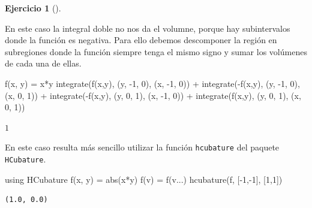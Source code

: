 \documentclass[
  a4paper,
]{scrreport}
\newenvironment{Shaded}{\begin{snugshade}}{\end{snugshade}}
\newcommand{\BuiltInTok}[1]{\textcolor[rgb]{0.00,0.23,0.31}{#1}}
\newcommand{\FloatTok}[1]{\textcolor[rgb]{0.68,0.00,0.00}{#1}}
\newcommand{\FunctionTok}[1]{\textcolor[rgb]{0.28,0.35,0.67}{#1}}
\newcommand{\ImportTok}[1]{\textcolor[rgb]{0.00,0.46,0.62}{#1}}
\newcommand{\NormalTok}[1]{\textcolor[rgb]{0.00,0.23,0.31}{#1}}
\newcommand{\OperatorTok}[1]{\textcolor[rgb]{0.37,0.37,0.37}{#1}}
\theoremstyle{definition}
\newtheorem{exercise}{Ejercicio}[chapter]
\theoremstyle{remark}
\begin{document}
\begin{exercise}[]
\begin{enumerate}
\begin{tcolorbox}
  En este caso la integral doble no nos da el volumne, porque hay
  subintervalos donde la función es negativa. Para ello debemos
  descomponer la región en subregiones donde la función siempre tenga el
  mismo signo y sumar los volúmenes de cada una de ellas.

\begin{Shaded}
\begin{Highlighting}[]
\FunctionTok{f}\NormalTok{(x, y) }\OperatorTok{=}\NormalTok{ x}\OperatorTok{*}\NormalTok{y  }
\FunctionTok{integrate}\NormalTok{(}\FunctionTok{f}\NormalTok{(x,y), (y, }\OperatorTok{{-}}\FloatTok{1}\NormalTok{, }\FloatTok{0}\NormalTok{), (x, }\OperatorTok{{-}}\FloatTok{1}\NormalTok{, }\FloatTok{0}\NormalTok{)) }\OperatorTok{+} \FunctionTok{integrate}\NormalTok{(}\FunctionTok{{-}f}\NormalTok{(x,y), (y, }\OperatorTok{{-}}\FloatTok{1}\NormalTok{, }\FloatTok{0}\NormalTok{), (x, }\FloatTok{0}\NormalTok{, }\FloatTok{1}\NormalTok{)) }\OperatorTok{+} \FunctionTok{integrate}\NormalTok{(}\FunctionTok{{-}f}\NormalTok{(x,y), (y, }\FloatTok{0}\NormalTok{, }\FloatTok{1}\NormalTok{), (x, }\OperatorTok{{-}}\FloatTok{1}\NormalTok{, }\FloatTok{0}\NormalTok{)) }\OperatorTok{+} \FunctionTok{integrate}\NormalTok{(}\FunctionTok{f}\NormalTok{(x,y), (y, }\FloatTok{0}\NormalTok{, }\FloatTok{1}\NormalTok{), (x, }\FloatTok{0}\NormalTok{, }\FloatTok{1}\NormalTok{))}
\end{Highlighting}
\end{Shaded}

  $1$

  En este caso resulta más sencillo utilizar la función
  \texttt{hcubature} del paquete \texttt{HCubature}.

\begin{Shaded}
\begin{Highlighting}[]
\ImportTok{using} \BuiltInTok{HCubature}
\FunctionTok{f}\NormalTok{(x, y) }\OperatorTok{=} \FunctionTok{abs}\NormalTok{(x}\OperatorTok{*}\NormalTok{y)}
\FunctionTok{f}\NormalTok{(v) }\OperatorTok{=} \FunctionTok{f}\NormalTok{(v}\OperatorTok{...}\NormalTok{)}
\FunctionTok{hcubature}\NormalTok{(f, [}\OperatorTok{{-}}\FloatTok{1}\NormalTok{,}\OperatorTok{{-}}\FloatTok{1}\NormalTok{], [}\FloatTok{1}\NormalTok{,}\FloatTok{1}\NormalTok{])}
\end{Highlighting}
\end{Shaded}

\begin{verbatim}
(1.0, 0.0)
\end{verbatim}

  \end{tcolorbox}
\end{enumerate}

\end{exercise}
\end{document}

